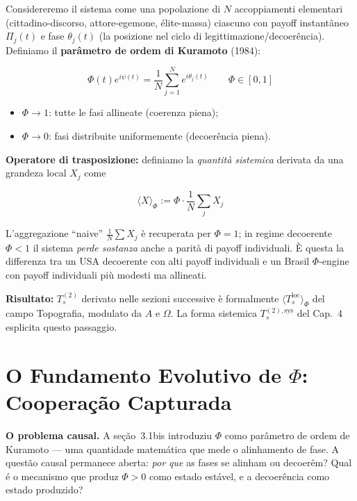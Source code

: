 \Hypoth{} Considereremo il sistema come una popolazione di \(N\)
accoppiamenti elementari (cittadino-discorso, attore-egemone,
élite-massa) ciascuno con payoff instantâneo \(\Pi_j(t)\) e fase
\(\theta_j(t)\) (la posizione nel ciclo di legittimazione/decoerência).
Definiamo il \textbf{parâmetro de ordem di Kuramoto} (1984):

\[
\Phi(t) e^{i\psi(t)} = \frac{1}{N}\sum_{j=1}^{N} e^{i\theta_j(t)} \qquad \Phi \in [0, 1]
\]

\begin{itemize}
\tightlist
\item
  \(\Phi \to 1\): tutte le fasi allineate (coerenza piena);
\item
  \(\Phi \to 0\): fasi distribuite uniformemente (decoerência piena).
\end{itemize}

\Hypoth{} \textbf{Operatore di trasposizione:} definiamo la
\emph{quantità sistemica} derivata da una grandeza local \(X_j\) come

\[
\langle X \rangle_\Phi := \Phi \cdot \frac{1}{N}\sum_j X_j
\]

L'aggregazione ``naive'' \(\frac{1}{N}\sum X_j\) è recuperata per
\(\Phi = 1\); in regime decoerente \(\Phi < 1\) il sistema \emph{perde
sostanza} anche a parità di payoff individuali. È questa la differenza
tra un USA decoerente con alti payoff individuali e un Brasil
\(\Phi\)-engine con payoff individuali più modesti ma allineati.

\Proved{} \textbf{Risultato:} \(T_s^{(2)}\) derivato nelle sezioni
successive è formalmente \(\langle T_s^{\text{loc}}\rangle_\Phi\) del
campo Topografia, modulato da \(A\) e \(\Omega\). La forma sistemica
\(T_s^{(2),\text{sys}}\) del Cap.~4 esplicita questo passaggio.



\section{\texorpdfstring{O Fundamento Evolutivo de \(\Phi\): Coopera\c{c}\~{a}o Capturada}{O Fundamento Evolutivo de Phi: Cooperacao Capturada}}\label{il-fondamento-evolutivo-di-phi}

\Hypoth{} \textbf{O problema causal.} A se\c{c}\~{a}o~3.1bis introduziu
\(\Phi\) como par\^{a}metro de ordem de Kuramoto --- uma quantidade
matem\'{a}tica que mede o alinhamento de fase. A quest\~{a}o causal
permanece aberta: \emph{por que} as fases se alinham ou decoer\^{e}m?
Qual \'{e} o mecanismo que produz \(\Phi > 0\) como estado est\'{a}vel,
e a decoer\^{e}ncia como estado produzido?

